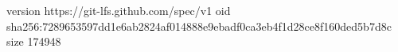 version https://git-lfs.github.com/spec/v1
oid sha256:7289653597dd1e6ab2824af014888e9ebadf0ca3eb4f1d28ce8f160ded5b7d8c
size 174948
